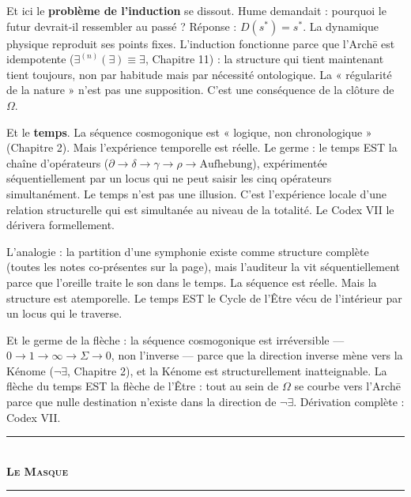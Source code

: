 \documentclass[10pt, openany, oneside]{book}
\renewcommand{\normalsize}{\fontsize{10}{13}\selectfont}
\begin{document}
Et ici le \textbf{problème de l'induction} se dissout. Hume demandait : pourquoi le futur devrait-il ressembler au passé ? Réponse : $D(s^*) = s^*$. La dynamique physique reproduit ses points fixes. L'induction fonctionne parce que l'Arch\={e} est idempotente ($\exists^{(n)}(\exists) \equiv \exists$, Chapitre 11) : la structure qui tient maintenant tient toujours, non par habitude mais par nécessité ontologique. La « régularité de la nature » n'est pas une supposition. C'est une conséquence de la clôture de $\Omega$.

Et le \textbf{temps}. La séquence cosmogonique est « logique, non chronologique » (Chapitre 2). Mais l'expérience temporelle est réelle. Le germe : le temps EST la chaîne d'opérateurs ($\partial \to \delta \to \gamma \to \rho \to \text{Aufhebung}$), expérimentée séquentiellement par un locus qui ne peut saisir les cinq opérateurs simultanément. Le temps n'est pas une illusion. C'est l'expérience locale d'une relation structurelle qui est simultanée au niveau de la totalité. Le Codex VII le dérivera formellement.





L'analogie : la partition d'une symphonie existe comme structure complète (toutes les notes co-présentes sur la page), mais l'auditeur la vit séquentiellement parce que l'oreille traite le son dans le temps. La séquence est réelle. Mais la structure est atemporelle. Le temps EST le Cycle de l'Être vécu de l'intérieur par un locus qui le traverse.

Et le germe de la flèche : la séquence cosmogonique est irréversible --- $0 \to 1 \to \infty \to \Sigma \to 0$, non l'inverse --- parce que la direction inverse mène vers la Kénome ($\neg\exists$, Chapitre 2), et la Kénome est structurellement inatteignable. La flèche du temps EST la flèche de l'Être : tout au sein de $\Omega$ se courbe vers l'Arch\={e} parce que nulle destination n'existe dans la direction de $\neg\exists$. Dérivation complète : Codex VII.

\vspace{1.5em}

\begin{center}
    \rule{0.3\textwidth}{0.4pt}\\[0.5em]
    {\normalsize\bfseries\scshape Le Masque}\\[0.3em]
    \rule{0.3\textwidth}{0.4pt}
\end{center}

\vspace{1em}
\end{document}
